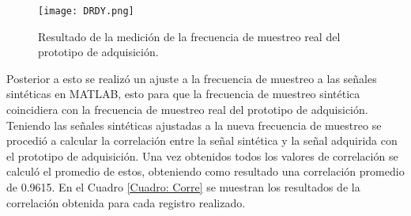 \begin{figure}[htbp]
	\centering
	\texttt{[image: DRDY.png]}
	\caption{Resultado de la medición de la frecuencia de muestreo real del prototipo de adquisición.}
	\label{Figura: DRDY}
\end{figure}

Posterior a esto se realizó un ajuste a la frecuencia de muestreo a las señales sintéticas en MATLAB, esto para que la frecuencia de muestreo sintética coincidiera con la frecuencia de muestreo real del prototipo de adquisición. Teniendo las señales sintéticas ajustadas a la nueva frecuencia de muestreo se procedió a calcular la correlación entre la señal sintética y la señal adquirida con el prototipo de adquisición. Una vez obtenidos todos los valores de correlación se calculó el promedio de estos, obteniendo como resultado una correlación promedio de 0.9615. En el Cuadro \ref{Cuadro: Corre} se muestran los resultados de la correlación obtenida para cada registro realizado.

